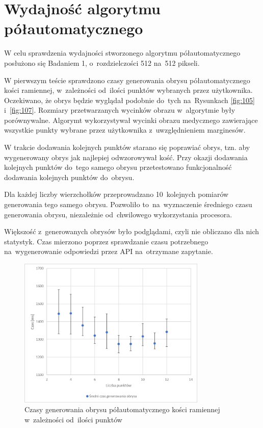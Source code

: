 \documentclass[a4paper,11pt,twoside,openright]{report}
\theoremstyle{definition}
\begin{document}
\section {Wydajność algorytmu półautomatycznego}

W celu sprawdzenia wydajności stworzonego algorytmu półautomatycznego posłużono
się Badaniem 1, o~rozdzielczości 512 na~512 pikseli.

W pierwszym teście sprawdzono czasy generowania obrysu półautomatycznego kości
ramiennej, w~zależności od~ilości punktów wybranych przez użytkownika. Oczekiwano,
że obrys będzie wyglądał podobnie do~tych na~Rysunkach \ref{fig:105} i~\ref{fig:107}.
Rozmiary przetwarzanych wycinków obrazu w~algorytmie były porównywalne. Algorymt
wykorzystywał wycinki obrazu medycznego zawierające wszystkie punkty wybrane
przez użytkownika z~uwzględnieniem marginesów.

W trakcie dodawania kolejnych punktów starano się poprawiać obrys, tzn. aby
wygenerowany obrys jak najlepiej odwzorowywał kość. Przy okazji dodawania kolejnych
punktów do~tego samego obrysu przetestowano funkcjonalność dodawania kolejnych
punktów do~obrysu.

Dla każdej liczby wierzchołków przeprowadzano 10~kolejnych pomiarów generowania
tego samego obrysu. Pozwoliło to~na~wyznaczenie średniego czasu generowania obrysu,
niezależnie od~chwilowego wykorzystania procesora.

Większość z~generowanych obrysów było podglądami, czyli nie obliczano dla nich
statystyk. Czas mierzono poprzez sprawdzanie czasu potrzebnego na~wygenerowanie
odpowiedzi przez API na~otrzymane zapytanie.

\begin{figure}[h!]
	\center
	\includegraphics[width=0.8\textwidth]{testy_1}
	\caption{Czasy generowania obrysu półautomatycznego kości ramiennej w~zależności od~ilości punktów}
    	\label{fig:testy_1}
\end{figure}
\end{document}
